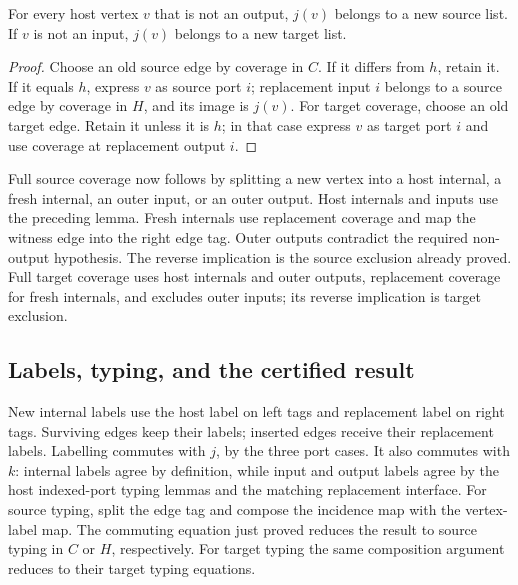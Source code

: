 \begin{lemma}
For every host vertex $v$ that is not an output, $j(v)$ belongs to a new source
list. If $v$ is not an input, $j(v)$ belongs to a new target list.
\end{lemma}
\begin{proof}
Choose an old source edge by coverage in $C$. If it differs from $h$, retain it.
If it equals $h$, express $v$ as source port $i$; replacement input $i$ belongs
to a source edge by coverage in $H$, and its image is $j(v)$. For target coverage,
choose an old target edge. Retain it unless it is $h$; in that case express $v$
as target port $i$ and use coverage at replacement output $i$.
\end{proof}
Full source coverage now follows by splitting a new vertex into a host internal,
a fresh internal, an outer input, or an outer output. Host internals and inputs
use the preceding lemma. Fresh internals use replacement coverage and map the
witness edge into the right edge tag. Outer outputs contradict the required
non-output hypothesis. The reverse implication is the source exclusion already
proved. Full target coverage uses host internals and outer outputs, replacement
coverage for fresh internals, and excludes outer inputs; its reverse implication
is target exclusion.

\subsection{Labels, typing, and the certified result}
New internal labels use the host label on left tags and replacement label on
right tags. Surviving edges keep their labels; inserted edges receive their
replacement labels.
Labelling commutes with $j$, by the three port cases. It also commutes with $k$:
internal labels agree by definition, while input and output labels agree by the
host indexed-port typing lemmas and the matching replacement interface.
For source typing, split the edge tag and compose the incidence map with the
vertex-label map. The commuting equation just proved reduces the result to
source typing in $C$ or $H$, respectively. For target typing the same composition
argument reduces to their target typing equations.

